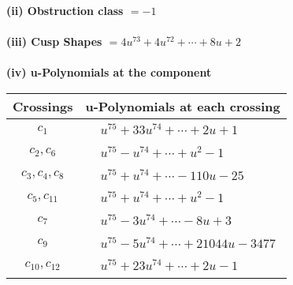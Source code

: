 \documentclass[1p]{elsarticle_modified}
\theoremstyle{definition}
\begin{document}
\flushleft \textbf{(ii) Obstruction class $= -1$}\\~\\
\flushleft \textbf{(iii) Cusp Shapes $= 4 u^{73}+4 u^{72}+\cdots+8 u+2$}\\~\\
\newpage\renewcommand{\arraystretch}{1}
\flushleft \textbf{(iv) u-Polynomials at the component}\newline \\
\begin{tabular}{m{50pt}|m{274pt}}
Crossings & \hspace{64pt}u-Polynomials at each crossing \\
\hline $$\begin{aligned}c_{1}\end{aligned}$$&$\begin{aligned}
&u^{75}+33 u^{74}+\cdots+2 u+1
\end{aligned}$\\
\hline $$\begin{aligned}c_{2},c_{6}\end{aligned}$$&$\begin{aligned}
&u^{75}- u^{74}+\cdots+u^2-1
\end{aligned}$\\
\hline $$\begin{aligned}c_{3},c_{4},c_{8}\end{aligned}$$&$\begin{aligned}
&u^{75}+u^{74}+\cdots-110 u-25
\end{aligned}$\\
\hline $$\begin{aligned}c_{5},c_{11}\end{aligned}$$&$\begin{aligned}
&u^{75}+u^{74}+\cdots+u^2-1
\end{aligned}$\\
\hline $$\begin{aligned}c_{7}\end{aligned}$$&$\begin{aligned}
&u^{75}-3 u^{74}+\cdots-8 u+3
\end{aligned}$\\
\hline $$\begin{aligned}c_{9}\end{aligned}$$&$\begin{aligned}
&u^{75}-5 u^{74}+\cdots+21044 u-3477
\end{aligned}$\\
\hline $$\begin{aligned}c_{10},c_{12}\end{aligned}$$&$\begin{aligned}
&u^{75}+23 u^{74}+\cdots+2 u-1
\end{aligned}$\\
\hline
\end{tabular}\\~\\
\end{document}

